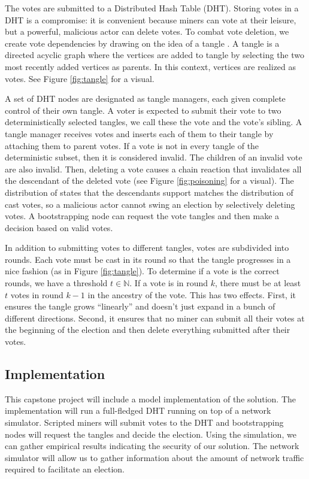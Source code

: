 The votes are submitted to a Distributed Hash Table (DHT).
Storing votes in a DHT is a compromise: it is convenient because miners can vote at their leisure, but a powerful, malicious actor can delete votes.
To combat vote deletion, we create vote dependencies by drawing on the idea of a tangle \cite{popov2016Tangle}.
A tangle is a directed acyclic graph where the vertices are added to tangle by selecting the two most recently added vertices as parents.
In this context, vertices are realized as votes.
See Figure \ref{fig:tangle} for a visual.



A set of DHT nodes are designated as tangle managers, each given complete control of their own tangle.
A voter is expected to submit their vote to two deterministically selected tangles, we call these the vote and the vote's sibling.
A tangle manager receives votes and inserts each of them to their tangle by attaching them to parent votes.
If a vote is not in every tangle of the deterministic subset, then it is considered invalid.
The children of an invalid vote are also invalid.
Then, deleting a vote causes a chain reaction that invalidates all the descendant of the deleted vote (see Figure \ref{fig:poisoning} for a visual).
The distribution of states that the descendants support matches the distribution of cast votes, so a malicious actor cannot swing an election by selectively deleting votes.
A bootstrapping node can request the vote tangles and then make a decision based on valid votes.



In addition to submitting votes to different tangles, votes are subdivided into rounds.
Each vote must be cast in its round so that the tangle progresses in a nice fashion (as in Figure \ref{fig:tangle}).
To determine if a vote is the correct rounds, we have a threshold $t \in \mathbb{N}$.
If a vote is in round $k$, there must be at least $t$ votes in round $k-1$ in the ancestry of the vote.
This has two effects.
First, it ensures the tangle grows ``linearly'' and doesn't just expand in a bunch of different directions.
Second, it ensures that no miner can submit all their votes at the beginning of the election and then delete everything submitted after their votes.

\subsection{Implementation}

This capstone project will include a model implementation of the solution.
The implementation will run a full-fledged DHT running on top of a network simulator.
Scripted miners will submit votes to the DHT and bootstrapping nodes will request the tangles and decide the election.
Using the simulation, we can gather empirical results indicating the security of our solution.
The network simulator will allow us to gather information about the amount of network traffic required to facilitate an election.